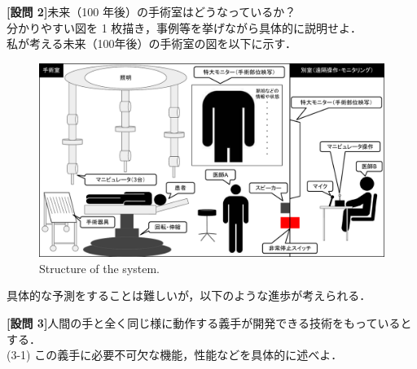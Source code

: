 \documentclass{jsarticle}
\begin{document}
\newpage

\vspace*{-10zh}

\textbf{{[設問 2]}}\hspace*{1zw}未来（100 年後）の手術室はどうなっているか？\\
\hspace*{5.7zw}分かりやすい図を 1 枚描き，事例等を挙げながら具体的に説明せよ．\\

\hspace*{5.7zw}私が考える未来（100年後）の手術室の図を以下に示す．

\begin{figure}[h!]
  \centering
  \includegraphics[width=160mm]{a.pdf}
  \caption{Structure of the system.}
\end{figure}

\hspace*{5.7zw}具体的な予測をすることは難しいが，以下のような進歩が考えられる．\\



\newpage

\vspace*{-10zh}

\textbf{{[設問 3]}}\hspace*{1zw}人間の手と全く同じ様に動作する義手が開発できる技術をもっているとする．\\
\hspace*{5.7zw}(3-1) この義手に必要不可欠な機能，性能などを具体的に述べよ．
\end{document}
